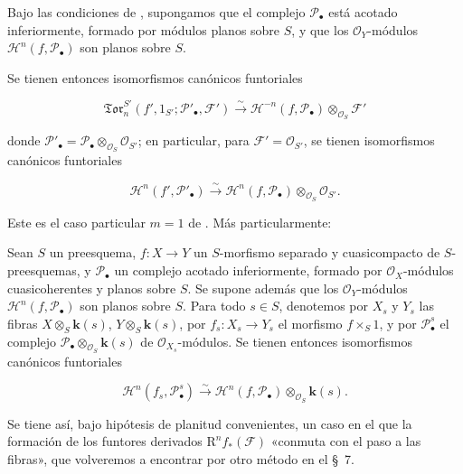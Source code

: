 \begin{corollary}[6.9.9]
\label{III.6.9.9}
Bajo las condiciones de , supongamos que el complejo
$\mathscr P_\bullet$ está acotado inferiormente, formado por módulos planos
sobre $S$, y que los $\mathscr O_Y$-módulos
$\mathscr H^n(f,\mathscr P_\bullet)$ son planos sobre $S$.

Se tienen entonces isomorfismos canónicos funtoriales

\label{III.6.9.9.1}
\[
  \mathfrak{Tor}_n^{S'}
  (f',1_{S'};\mathscr P'_\bullet,\mathscr F')
  \xrightarrow{\sim}
  \mathscr H^{-n}(f,\mathscr P_\bullet)
  \otimes_{\mathscr O_S}\mathscr F'
  \tag{6.9.9.1}\label{III.6.9.9.1.fr}
\]

donde
$\mathscr P'_\bullet=\mathscr P_\bullet\otimes_{\mathscr O_S}
\mathscr O_{S'}$; en particular, para $\mathscr F'=\mathscr O_{S'}$, se
tienen isomorfismos canónicos funtoriales

\label{III.6.9.9.2}
\[
  \mathscr H^n(f',\mathscr P'_\bullet)
  \xrightarrow{\sim}
  \mathscr H^n(f,\mathscr P_\bullet)
  \otimes_{\mathscr O_S}\mathscr O_{S'}.
  \tag{6.9.9.2}\label{III.6.9.9.2.fr}
\]

\textup{Este es el caso particular $m=1$ de . Más particularmente:}
\end{corollary}

\begin{corollary}[6.9.10]
\label{III.6.9.10}
Sean $S$ un preesquema, $f:X\to Y$ un $S$-morfismo separado y cuasicompacto
de $S$-preesquemas, y $\mathscr P_\bullet$ un complejo acotado
inferiormente, formado por $\mathscr O_X$-módulos cuasicoherentes y planos
sobre $S$. Se supone además que los $\mathscr O_Y$-módulos
$\mathscr H^n(f,\mathscr P_\bullet)$ son planos sobre $S$. Para todo $s\in S$,
denotemos por $X_s$ y $Y_s$ las fibras
$X\otimes_S \boldsymbol{k}(s)$, $Y\otimes_S \boldsymbol{k}(s)$,
por $f_s:X_s\to Y_s$ el morfismo $f\times_S1$, y por
$\mathscr P_\bullet^s$ el complejo
$\mathscr P_\bullet\otimes_{\mathscr O_S}\boldsymbol{k}(s)$ de
$\mathscr O_{X_s}$-módulos. Se tienen entonces isomorfismos canónicos
funtoriales

\label{III.6.9.10.1}
\[
  \mathscr H^n(f_s,\mathscr P_\bullet^s)
  \xrightarrow{\sim}
  \mathscr H^n(f,\mathscr P_\bullet)\otimes_{\mathscr O_S}\boldsymbol{k}(s).
  \tag{6.9.10.1}\label{III.6.9.10.1.fr}
\]

\end{corollary}

Se tiene así, bajo hipótesis de planitud convenientes, un caso en el que la
formación de los funtores derivados $\mathrm R^nf_*(\mathscr F)$ «conmuta con el paso
a las fibras», que volveremos a encontrar por otro método en el §~7.
